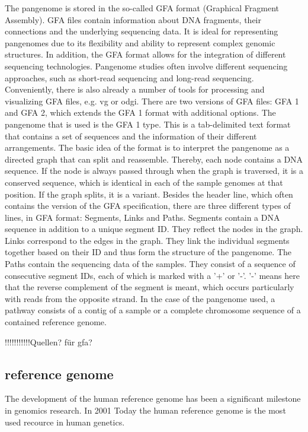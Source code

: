 The pangenome is stored in the so-called GFA format (Graphical Fragment Assembly). \cite{siren2022gbz} GFA files contain information about DNA fragments, their connections and the underlying sequencing data. It is ideal for representing pangenomes due to its flexibility and ability to represent complex genomic structures. In addition, the GFA format allows for the integration of different sequencing technologies. Pangenome studies often involve different sequencing approaches, such as short-read sequencing and long-read sequencing. Conveniently, there is also already a number of tools for processing and visualizing GFA files, e.g. vg or odgi.
There are two versions of GFA files: GFA 1 and GFA 2, which extends the GFA 1 format with additional options.
The pangenome that is used is the GFA 1 type. This is a tab-delimited text format that contains a set of sequences and the information of their different arrangements. The basic idea of the format is to interpret the pangenome as a directed graph that can split and reassemble. Thereby, each node contains a DNA sequence. If the node is always passed through when the graph is traversed, it is a conserved sequence, which is identical in each of the sample genomes at that position. If the graph splits, it is a variant.
Besides the header line, which often contains the version of the GFA specification, there are three different types of lines, in GFA format: Segments, Links and Paths.
Segments contain a DNA sequence in addition to a unique segment ID. They reflect the nodes in the graph. Links correspond to the edges in the graph. They link the individual segments together based on their ID and thus form the structure of the pangenome.
The Paths contain the sequencing data of the samples. They consist of a sequence of consecutive segment IDs, each of which is marked with a '+' or '-'. '-' means here that the reverse complement of the segment is meant, which occurs particularly with reads from the opposite strand.
In the case of the pangenome used, a pathway consists of a contig of a sample or a complete chromosome sequence of a contained reference genome.

!!!!!!!!!!!Quellen? für gfa?

\subsection{reference genome}
The development of the human reference genome has been a significant milestone in genomics research. In 2001
Today the human reference genome is the most used recource in human genetics. \cite{wang2022human}

